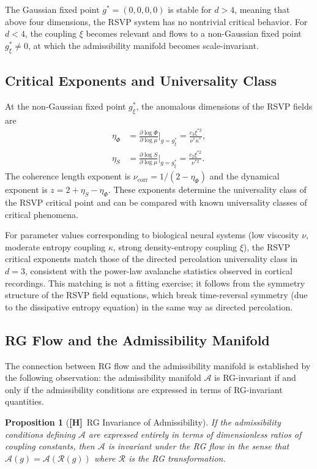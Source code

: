 \documentclass[11pt, oneside]{article}
\numberwithin{equation}{section}
\newcommand{\ClaimH}{\textcolor{rsvpgray}{\textbf{[H]}}}
\theoremstyle{rsvpstyle}
\newtheorem{proposition}[theorem]{Proposition}
\theoremstyle{remark}
\newcommand{\Adm}{\mathcal{A}}
\begin{document}
The Gaussian fixed point $g^* = (0,0,0,0)$ is stable for $d > 4$, meaning that
above four dimensions, the RSVP system has no nontrivial critical behavior. For
$d < 4$, the coupling $\xi$ becomes relevant and flows to a non-Gaussian fixed
point $g^*_\xi \neq 0$, at which the admissibility manifold becomes scale-invariant.

\subsection{Critical Exponents and Universality Class}

At the non-Gaussian fixed point $g^*_\xi$, the anomalous dimensions of the RSVP
fields are
\begin{align}
  \eta_\Phi &= \frac{\partial \log \Phi}{\partial \log \mu}\bigg|_{g = g^*_\xi}
  = \frac{c_3 \xi^{*2}}{\nu^* \kappa^*}, \\
  \eta_S &= \frac{\partial \log S}{\partial \log \mu}\bigg|_{g = g^*_\xi}
  = \frac{c_2 \xi^{*2}}{\nu^{*2}}.
\end{align}
The coherence length exponent is $\nu_\text{corr} = 1/(2 - \eta_\Phi)$ and the
dynamical exponent is $z = 2 + \eta_S - \eta_\Phi$. These exponents determine the
universality class of the RSVP critical point and can be compared with known
universality classes of critical phenomena.

For parameter values corresponding to biological neural systems (low viscosity $\nu$,
moderate entropy coupling $\kappa$, strong density-entropy coupling $\xi$), the RSVP
critical exponents match those of the directed percolation universality class in $d = 3$,
consistent with the power-law avalanche statistics observed in cortical recordings.
This matching is not a fitting exercise; it follows from the symmetry structure of
the RSVP field equations, which break time-reversal symmetry (due to the dissipative
entropy equation) in the same way as directed percolation.

\subsection{RG Flow and the Admissibility Manifold}

The connection between RG flow and the admissibility manifold is established by the
following observation: the admissibility manifold $\Adm$ is RG-invariant if and only
if the admissibility conditions are expressed in terms of RG-invariant quantities.

\begin{proposition}[\ClaimH\ RG Invariance of Admissibility]
If the admissibility conditions defining $\Adm$ are expressed entirely in terms of
dimensionless ratios of coupling constants, then $\Adm$ is invariant under the RG
flow in the sense that $\Adm(g) = \Adm(\mathcal{R}(g))$ where $\mathcal{R}$ is
the RG transformation.
\end{proposition}
\end{document}
